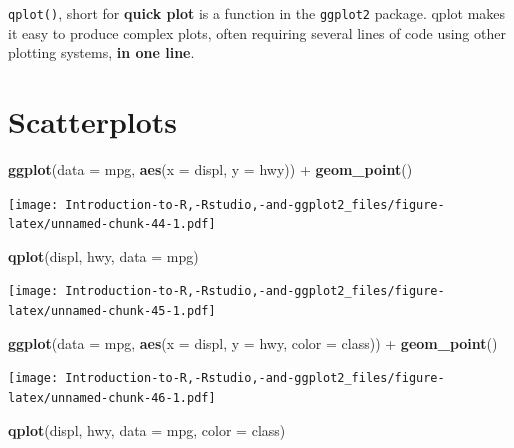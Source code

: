 \documentclass[]{book}
\newenvironment{Shaded}{\begin{snugshade}}{\end{snugshade}}
\newcommand{\KeywordTok}[1]{\textcolor[rgb]{0.13,0.29,0.53}{\textbf{{#1}}}}
\newcommand{\DataTypeTok}[1]{\textcolor[rgb]{0.13,0.29,0.53}{{#1}}}
\newcommand{\StringTok}[1]{\textcolor[rgb]{0.31,0.60,0.02}{{#1}}}
\newcommand{\NormalTok}[1]{{#1}}
\begin{document}
\texttt{qplot()}, short for \textbf{quick plot} is a function in the
\texttt{ggplot2} package. qplot makes it easy to produce complex plots,
often requiring several lines of code using other plotting systems,
\textbf{in one line}.

\section{Scatterplots}\label{scatterplots}

\begin{Shaded}
\begin{Highlighting}[]
\KeywordTok{ggplot}\NormalTok{(}\DataTypeTok{data =} \NormalTok{mpg, }\KeywordTok{aes}\NormalTok{(}\DataTypeTok{x =} \NormalTok{displ, }\DataTypeTok{y =} \NormalTok{hwy)) +}\StringTok{ }\KeywordTok{geom_point}\NormalTok{()}
\end{Highlighting}
\end{Shaded}

\texttt{[image: Introduction-to-R,-Rstudio,-and-ggplot2\_files/figure-latex/unnamed-chunk-44-1.pdf]}

\begin{Shaded}
\begin{Highlighting}[]
\KeywordTok{qplot}\NormalTok{(displ, hwy, }\DataTypeTok{data =} \NormalTok{mpg)}
\end{Highlighting}
\end{Shaded}

\texttt{[image: Introduction-to-R,-Rstudio,-and-ggplot2\_files/figure-latex/unnamed-chunk-45-1.pdf]}

\begin{Shaded}
\begin{Highlighting}[]
\KeywordTok{ggplot}\NormalTok{(}\DataTypeTok{data =} \NormalTok{mpg, }\KeywordTok{aes}\NormalTok{(}\DataTypeTok{x =} \NormalTok{displ, }\DataTypeTok{y =} \NormalTok{hwy, }\DataTypeTok{color =} \NormalTok{class)) +}\StringTok{ }\KeywordTok{geom_point}\NormalTok{()}
\end{Highlighting}
\end{Shaded}

\texttt{[image: Introduction-to-R,-Rstudio,-and-ggplot2\_files/figure-latex/unnamed-chunk-46-1.pdf]}

\begin{Shaded}
\begin{Highlighting}[]
\KeywordTok{qplot}\NormalTok{(displ, hwy, }\DataTypeTok{data =} \NormalTok{mpg, }\DataTypeTok{color =} \NormalTok{class)}
\end{Highlighting}
\end{Shaded}
\end{document}
